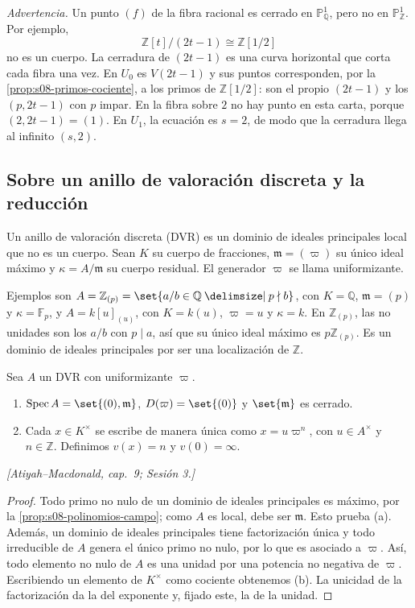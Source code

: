\emph{Advertencia.} Un punto $(f)$ de la fibra racional es cerrado en $\mathbb P_{\mathbb Q}^1$, pero no en $\mathbb P_{\mathbb Z}^1$. Por ejemplo,
\[
\mathbb Z[t]/(2t-1)\cong\mathbb Z[1/2]
\]
no es un cuerpo. La cerradura de $(2t-1)$ es una curva horizontal que corta cada fibra una vez. En $U_0$ es $V(2t-1)$ y sus puntos corresponden, por la \cref{prop:s08-primos-cociente}, a los primos de $\mathbb Z[1/2]$: son el propio $(2t-1)$ y los $(p,2t-1)$ con $p$ impar. En la fibra sobre $2$ no hay punto en esta carta, porque $(2,2t-1)=(1)$. En $U_1$, la ecuación es $s=2$, de modo que la cerradura llega al infinito $(s,2)$.

\begin{samepage}
\subsection{Sobre un anillo de valoración discreta y la reducción}

\begin{defi}
\label{defi:s08-dvr}
Un anillo de valoración discreta (DVR) es un dominio de ideales principales local que no es un cuerpo. Sean $K$ su cuerpo de fracciones, $\mathfrak m=(\varpi)$ su único ideal máximo y $\kappa=A/\mathfrak m$ su cuerpo residual. El generador $\varpi$ se llama uniformizante.

Ejemplos son $A=\mathbb Z_{(p)}=\set{a/b\in\mathbb Q\given p\nmid b}$, con $K=\mathbb Q$, $\mathfrak m=(p)$ y $\kappa=\mathbb F_p$, y $A=k[u]_{(u)}$, con $K=k(u)$, $\varpi=u$ y $\kappa=k$. En $\mathbb Z_{(p)}$, las no unidades son los $a/b$ con $p\mid a$, así que su único ideal máximo es $p\mathbb Z_{(p)}$. Es un dominio de ideales principales por ser una localización de $\mathbb Z$.
\end{defi}
\end{samepage}

\begin{prop}
\label{prop:s08-estructura-dvr}
Sea $A$ un DVR con uniformizante $\varpi$.
\begin{enumerate}[label=(\alph*)]
\item $\Spec A=\set{(0),\mathfrak m}$, $D(\varpi)=\set{(0)}$ y $\set{\mathfrak m}$ es cerrado.
\item Cada $x\in K^\times$ se escribe de manera única como $x=u\varpi^n$, con $u\in A^\times$ y $n\in\mathbb Z$. Definimos $v(x)=n$ y $v(0)=\infty$.
\end{enumerate}
\emph{[Atiyah--Macdonald, cap.~9; Sesión 3.]}
\end{prop}
\begin{proof}
Todo primo no nulo de un dominio de ideales principales es máximo, por la \cref{prop:s08-polinomios-campo}; como $A$ es local, debe ser $\mathfrak m$. Esto prueba (a). Además, un dominio de ideales principales tiene factorización única y todo irreducible de $A$ genera el único primo no nulo, por lo que es asociado a $\varpi$. Así, todo elemento no nulo de $A$ es una unidad por una potencia no negativa de $\varpi$. Escribiendo un elemento de $K^\times$ como cociente obtenemos (b). La unicidad de la factorización da la del exponente y, fijado este, la de la unidad.
\end{proof}

